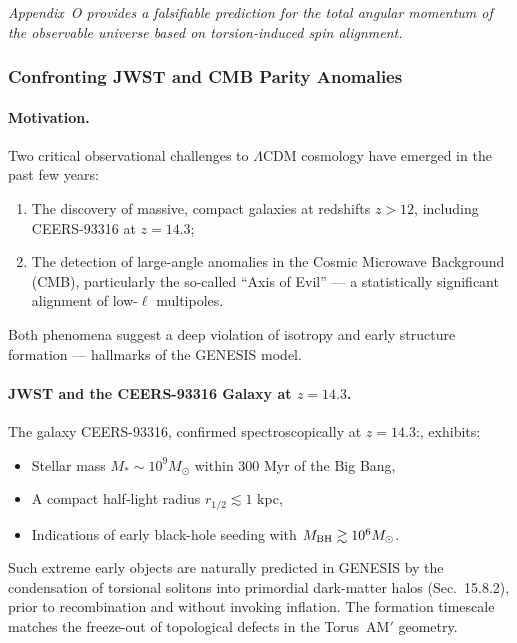 \documentclass{article}
\begin{document}
\vspace{0.5em}
\noindent
\textit{Appendix~O provides a falsifiable prediction for the total angular momentum of the observable universe based on torsion-induced spin alignment.}

\subsubsection{ Confronting JWST and CMB Parity Anomalies}


\paragraph{Motivation.}
Two critical observational challenges to $\Lambda$CDM cosmology have emerged in the past few years:
\begin{enumerate}
    \item The discovery of massive, compact galaxies at redshifts $z > 12$, including CEERS-93316 at $z = 14.3$;
    \item The detection of large-angle anomalies in the Cosmic Microwave Background (CMB), particularly the so-called ``Axis of Evil'' --- a statistically significant alignment of low-$\ell$ multipoles.
\end{enumerate}
Both phenomena suggest a deep violation of isotropy and early structure formation --- hallmarks of the GENESIS model.

\paragraph{JWST and the CEERS-93316 Galaxy at $z = 14.3$.}
The galaxy CEERS-93316, confirmed spectroscopically at $z = 14.3$:\cite{Donnan2023CEERS93316}, exhibits:
\begin{itemize}
    \item Stellar mass $M_* \sim 10^9 M_\odot$ within 300 Myr of the Big Bang,
    \item A compact half-light radius $r_{1/2} \lesssim 1$ kpc,
    \item Indications of early black-hole seeding with $M_{\rm BH} \gtrsim 10^6 M_\odot$.
\end{itemize}
Such extreme early objects are naturally predicted in GENESIS by the condensation of torsional solitons into primordial dark-matter halos (Sec.~15.8.2), prior to recombination and without invoking inflation. The formation timescale matches the freeze-out of topological defects in the Torus~AM$'$ geometry.
\end{document}
